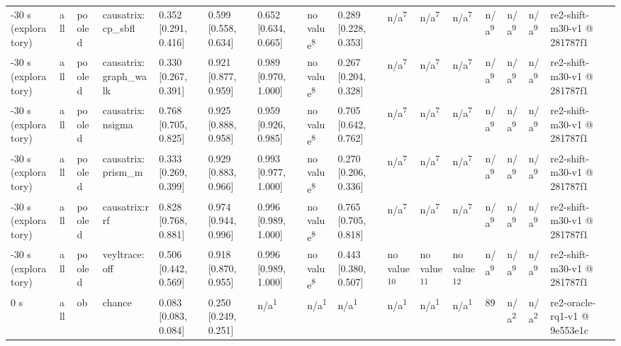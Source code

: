 \begin{table}[t]
\begin{tabular}{llllllllllllllll}
-30 s (exploratory) & all & pooled & causatrix:cp\_sbfl & 0.352 [0.291, 0.416] & 0.599 [0.558, 0.634] & 0.652 [0.634, 0.665] & no value\textsuperscript{8} & 0.289 [0.228, 0.353] & n/a\textsuperscript{7} & n/a\textsuperscript{7} & n/a\textsuperscript{7} & n/a\textsuperscript{9} & n/a\textsuperscript{9} & n/a\textsuperscript{9} & re2-shift-m30-v1 @ 281787f1 \\
-30 s (exploratory) & all & pooled & causatrix:graph\_walk & 0.330 [0.267, 0.391] & 0.921 [0.877, 0.959] & 0.989 [0.970, 1.000] & no value\textsuperscript{8} & 0.267 [0.204, 0.328] & n/a\textsuperscript{7} & n/a\textsuperscript{7} & n/a\textsuperscript{7} & n/a\textsuperscript{9} & n/a\textsuperscript{9} & n/a\textsuperscript{9} & re2-shift-m30-v1 @ 281787f1 \\
-30 s (exploratory) & all & pooled & causatrix:nsigma & 0.768 [0.705, 0.825] & 0.925 [0.888, 0.958] & 0.959 [0.926, 0.985] & no value\textsuperscript{8} & 0.705 [0.642, 0.762] & n/a\textsuperscript{7} & n/a\textsuperscript{7} & n/a\textsuperscript{7} & n/a\textsuperscript{9} & n/a\textsuperscript{9} & n/a\textsuperscript{9} & re2-shift-m30-v1 @ 281787f1 \\
-30 s (exploratory) & all & pooled & causatrix:prism\_m & 0.333 [0.269, 0.399] & 0.929 [0.883, 0.966] & 0.993 [0.977, 1.000] & no value\textsuperscript{8} & 0.270 [0.206, 0.336] & n/a\textsuperscript{7} & n/a\textsuperscript{7} & n/a\textsuperscript{7} & n/a\textsuperscript{9} & n/a\textsuperscript{9} & n/a\textsuperscript{9} & re2-shift-m30-v1 @ 281787f1 \\
-30 s (exploratory) & all & pooled & causatrix:rrf & 0.828 [0.768, 0.881] & 0.974 [0.944, 0.996] & 0.996 [0.989, 1.000] & no value\textsuperscript{8} & 0.765 [0.705, 0.818] & n/a\textsuperscript{7} & n/a\textsuperscript{7} & n/a\textsuperscript{7} & n/a\textsuperscript{9} & n/a\textsuperscript{9} & n/a\textsuperscript{9} & re2-shift-m30-v1 @ 281787f1 \\
-30 s (exploratory) & all & pooled & veyltrace:off & 0.506 [0.442, 0.569] & 0.918 [0.870, 0.955] & 0.996 [0.989, 1.000] & no value\textsuperscript{8} & 0.443 [0.380, 0.507] & no value\textsuperscript{10} & no value\textsuperscript{11} & no value\textsuperscript{12} & n/a\textsuperscript{9} & n/a\textsuperscript{9} & n/a\textsuperscript{9} & re2-shift-m30-v1 @ 281787f1 \\
0 s & all & ob & chance & 0.083 [0.083, 0.084] & 0.250 [0.249, 0.251] & n/a\textsuperscript{1} & n/a\textsuperscript{1} & n/a\textsuperscript{1} & n/a\textsuperscript{1} & n/a\textsuperscript{1} & n/a\textsuperscript{1} & 89 & n/a\textsuperscript{2} & n/a\textsuperscript{2} & re2-oracle-rq1-v1 @ 9e553e1c \\

\end{tabular}
\end{table}

